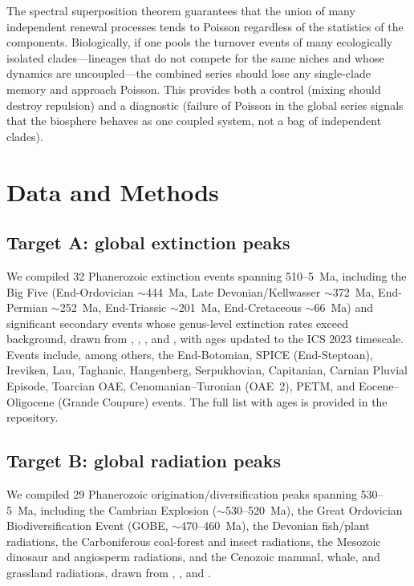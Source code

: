 \documentclass[12pt,a4paper]{article}
\begin{document}
The spectral superposition theorem \citep{daley2003} guarantees that the union of many independent renewal processes tends to Poisson regardless of the statistics of the components. Biologically, if one pools the turnover events of many ecologically isolated clades---lineages that do not compete for the same niches and whose dynamics are uncoupled---the combined series should lose any single-clade memory and approach Poisson. This provides both a control (mixing should destroy repulsion) and a diagnostic (failure of Poisson in the global series signals that the biosphere behaves as one coupled system, not a bag of independent clades).

\section{Data and Methods}

\subsection{Target A: global extinction peaks}

We compiled 32 Phanerozoic extinction events spanning 510--5~Ma, including the Big Five (End-Ordovician $\sim$444~Ma, Late Devonian/Kellwasser $\sim$372~Ma, End-Permian $\sim$252~Ma, End-Triassic $\sim$201~Ma, End-Cretaceous $\sim$66~Ma) and significant secondary events whose genus-level extinction rates exceed background, drawn from \citet{sepkoski2002}, \citet{bambach2006}, \citet{raup1982}, and \citet{bond2017}, with ages updated to the ICS 2023 timescale. Events include, among others, the End-Botomian, SPICE (End-Steptoan), Ireviken, Lau, Taghanic, Hangenberg, Serpukhovian, Capitanian, Carnian Pluvial Episode, Toarcian OAE, Cenomanian--Turonian (OAE~2), PETM, and Eocene--Oligocene (Grande Coupure) events. The full list with ages is provided in the repository.

\subsection{Target B: global radiation peaks}

We compiled 29 Phanerozoic origination/diversification peaks spanning 530--5~Ma, including the Cambrian Explosion ($\sim$530--520~Ma), the Great Ordovician Biodiversification Event (GOBE, $\sim$470--460~Ma), the Devonian fish/plant radiations, the Carboniferous coal-forest and insect radiations, the Mesozoic dinosaur and angiosperm radiations, and the Cenozoic mammal, whale, and grassland radiations, drawn from \citet{sepkoski2002}, \citet{alroy2008}, and \citet{servais2009}.
\end{document}
